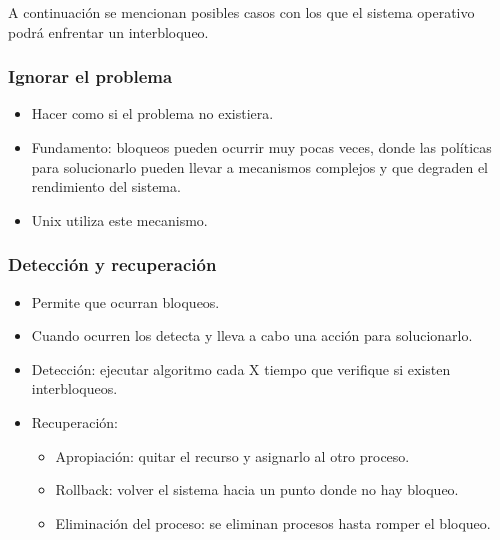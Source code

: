 A continuación se mencionan posibles casos con los que el sistema operativo
podrá enfrentar un interbloqueo.

\subsubsection{Ignorar el problema}
\begin{itemize}

	\item Hacer como si el problema no existiera.

	\item Fundamento: bloqueos pueden ocurrir muy pocas veces, donde las
	políticas para solucionarlo pueden llevar a mecanismos complejos y que
	degraden el rendimiento del sistema.

	\item Unix utiliza este mecanismo.

\end{itemize}

\subsubsection{Detección y recuperación}
\begin{itemize}

	\item Permite que ocurran bloqueos.

	\item Cuando ocurren los detecta y lleva a cabo una acción para
	solucionarlo.

	\item Detección: ejecutar algoritmo cada X tiempo que verifique si
	existen interbloqueos.

	\item Recuperación:
	\begin{itemize}

		\item Apropiación: quitar el recurso y asignarlo al otro
		proceso.

		\item Rollback: volver el sistema hacia un punto donde no hay
		bloqueo.

		\item Eliminación del proceso: se eliminan procesos hasta romper
		el bloqueo.

	\end{itemize}

\end{itemize}

